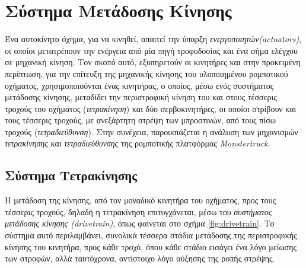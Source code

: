 

\newpage
\section{Σύστημα Μετάδοσης Κίνησης} \label{sec:motion_transfer_system}
Ένα αυτοκίνητο όχημα, για να κινηθεί, απαιτεί την ύπαρξη \textit{ενεργοποιητών(actuators)}, οι οποίοι μετατρέπουν την ενέργεια από μία πηγή τροφοδοσίας και ένα σήμα ελέγχου σε μηχανική κίνηση. Τον σκοπό αυτό, εξυπηρετούν οι κινητήρες και στην προκειμένη περίπτωση, για την επίτευξη της μηχανικής κίνησης του υλοποιημένου ρομποτικού οχήματος, χρησιμοποιούνται ένας κινητήρας, ο οποίος, μέσω ενός συστήματος μετάδοσης κίνησης, μεταδίδει την περιστροφική κίνηση του και στους τέσσερις τροχούς του οχήματος (\textit{τετρακίνηση}) και δύο σερβοκινητήρες, οι οποίοι στρίβουν και τους τέσσερις τροχούς, με ανεξάρτητη στρέψη των μπροστινών, από τους πίσω τροχούς  (\textit{τετραδιεύθυνση}). Στην συνέχεια, παρουσιάζεται η ανάλυση των μηχανισμών \textit{τετρακίνησης} και \textit{τετραδιεύθυνσης} της ρομποτικής πλατφόρμας \textit{Monstertruck}.


\bigskip
\subsection{Σύστημα Τετρακίνησης} \label{ssec:four_wheel_drive}
Η μετάδοση της κίνησης, από τον μοναδικό κινητήρα του οχήματος, προς τους τέσσερις τροχούς, δηλαδή η τετρακίνηση επιτυγχάνεται, μέσω του \textit{συστήματος μετάδοσης κίνησης (drivetrain)}, όπως φαίνεται στο σχήμα \ref{fig:drivetrain}. Το σύστημα αυτό περιλαμβάνει, συνολικά τέσσερα στάδια μετάδοσης της περιστροφικής κίνησης του κινητήρα, προς κάθε τροχό, όπου κάθε στάδιο εισάγει ένα λόγο μείωσης των στροφών, αλλά ταυτόχρονα, αντίστοιχο λόγο αύξησης της ροπής στρέψης.

